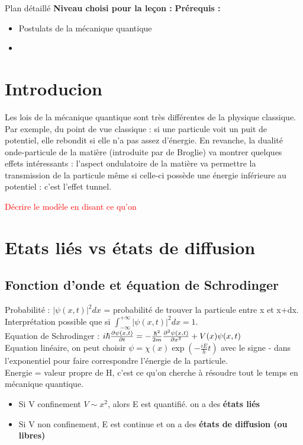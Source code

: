 \begin{reportBlock}{Plan détaillé}
  \textbf{Niveau choisi pour la leçon :} 
  \newline
  \textbf{Prérequis : }
  \begin{itemize}
      \item Postulats de la mécanique quantique
      \item 
  \end{itemize}

\section*{Introducion}
Les lois de la mécanique quantique sont très différentes de la physique classique. Par exemple, du point de vue classique : si une particule voit un puit de potentiel, elle rebondit si elle n'a pas assez d'énergie. En revanche, la dualité onde-particule de la matière (introduite par de Broglie) va montrer quelques effets intéressants : l'aspect ondulatoire de la matière va permettre la transmission de la particule même si celle-ci possède une énergie inférieure au potentiel : c'est l'effet tunnel.

\textcolor{red}{Décrire le modèle en disant ce qu'on}
\section{Etats liés vs états de diffusion}
\subsection{Fonction d'onde et équation de Schrodinger}

Probabilité : $|\psi(x,t)|^2dx$ = probabilité de trouver la particule entre x et x+dx. Interprétation possible que si $\int_{-\infty}^{+\infty}|\psi(x,t)|^2dx=1$.\\

Equation de Schrodinger : $i\hbar\frac{\partial \psi(x,t)}{\partial t}=-\frac{\hbar^2}{2m}\frac{\partial ^2\psi(x,t)}{\partial x^2}+V(x)\psi(x,t)$\\

Equation linéaire, on peut choisir $\psi = \chi(x)\exp\left(-\frac{iE}{h}t\right)$ avec le signe - dans l'exponentiel pour faire correspondre l'énergie de la particule.\\

Energie = valeur propre de H, c'est ce qu'on cherche à résoudre tout le temps en mécanique quantique. 
\begin{itemize}
    \item Si V confinement $V\sim x^2$, alors E est quantifié. on a des \textbf{états liés}
    \item Si V non confinement, E est continue et on a des \textbf{états de diffusion (ou libres)}
\end{itemize}


\end{reportBlock}
